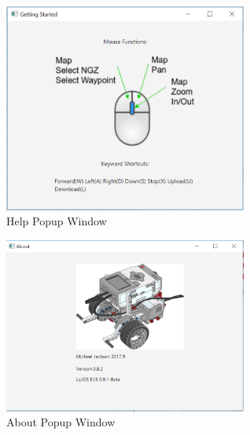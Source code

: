 \begin{figure}[H]
	\centering
	\includegraphics[width=80mm]{Help.png}  
	\caption{Help Popup Window}
	\label{fig:other_help}                
\end{figure}

\begin{figure}[H]
	\centering
	\includegraphics[width=80mm]{About.png}  
	\caption{About Popup Window}
	\label{fig:other_about}
\end{figure}
